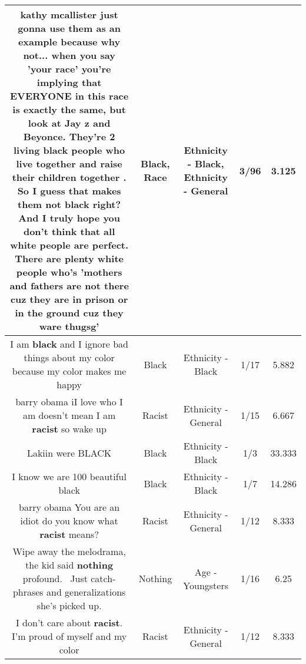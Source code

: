 \documentclass[11pt]{article}
\newlength\mylength
\begin{document}
\begin{center}
\begin{longtable}{|C{.65\mylength}|C{.30\mylength}|C{.12\mylength}|C{.12\mylength}|C{.12\mylength}|}
  \small kathy mcallister just gonna use them as an example because why not... when you say 'your \textbf{race}' you're implying that EVERYONE in this \textbf{race} is exactly the same, but look at Jay z and Beyonce. They're 2 living \textbf{black} people who live together and raise their children together . So I guess that makes them not \textbf{black} right? And I truly hope you don't think that all white people are perfect. There are plenty white people who's 'mothers and fathers are not there cuz they are in prison or in the ground cuz they ware thugsg'\normalsize   & Black, Race & Ethnicity - Black, Ethnicity - General & 3/96 & 3.125 \\  \hline
  \small I am \textbf{black} and I ignore bad things about my color because my color makes me happy\normalsize   & Black & Ethnicity - Black & 1/17 & 5.882 \\  \hline
  \small barry obama iI love who I am doesn't mean I am \textbf{racist} so wake up\normalsize   & Racist & Ethnicity - General & 1/15 & 6.667 \\  \hline
  \small Lakiin were BLACK\normalsize   & Black & Ethnicity - Black & 1/3 & 33.333 \\  \hline
  \small I know we are 100 beautiful black\normalsize   & Black & Ethnicity - Black & 1/7 & 14.286 \\  \hline
  \small barry obama You are an idiot do you know what \textbf{racist} means?\normalsize   & Racist & Ethnicity - General & 1/12 & 8.333 \\  \hline
  \small Wipe away the melodrama, the kid said \textbf{nothing} profound.  Just catch-phrases and generalizations she's picked up.\normalsize   & Nothing & Age - Youngsters & 1/16 & 6.25 \\  \hline
  \small I don't care about \textbf{racist}. I'm proud of myself and my color\normalsize   & Racist & Ethnicity - General & 1/12 & 8.333 \\  \hline

\end{longtable}
\end{center}
\end{document}
